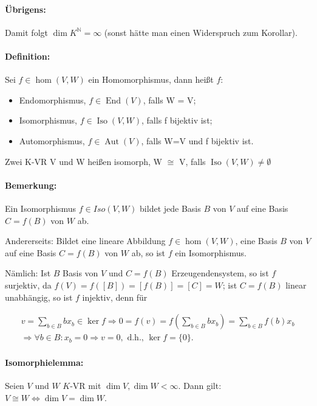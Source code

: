 \paragraph{Übrigens: }
	Damit folgt $\dim K^\mathbb{N} =\infty$ (sonst hätte man einen Widerspruch zum Korollar).
		
\paragraph{Definition: }
	Sei $f\in \hom(V,W)$ ein Homomorphismus, dann heißt $f$:
	\begin{itemize}
		\item Endomorphismus, $f\in \operatorname{End} (V)$, falls W = V;
		\item Isomorphismus, $f\in \operatorname{Iso}(V,W)$, falls f bijektiv ist;
		\item Automorphismus, $f\in \operatorname{Aut}(V)$, falls W=V und f bijektiv ist.
	\end{itemize}
	
	Zwei K-VR V und W heißen isomorph, W $\cong$ V, falls $\operatorname{Iso}(V,W) \neq \emptyset$

\paragraph{Bemerkung: }
	Ein Isomorphismus $f\in Iso(V,W)$ bildet jede Basis $B$ von $V$ auf eine Basis $C = f(B)$ von $W$ ab.
	
	Andererseits: Bildet eine lineare Abbildung $f\in \hom(V,W)$, eine Basis $B$ von $V$ auf eine Basis $C = f(B)$ von $W$ ab, so ist $f$ ein Isomorphismus.
	
	Nämlich: Ist $B$ Basis von $V$ und $ C = f(B)$ Erzeugendensystem, so ist $f$ surjektiv, da $f(V) = f ([B]) = [f(B)] = [C] = W$;
	ist $C =f(B)$ linear unabhängig, so ist $f$ injektiv, denn für
			
	\begin{gather*}
		v = \sum_{b\in B} bx_b \in \ker f \Rightarrow 0 = f(v) = f(\sum_{b\in B}bx_b) = \sum_{b\in B}f(b)x_b\\
		\Rightarrow \forall b \in B: x_b = 0 \Rightarrow v = 0, \text{ d.h., } \ker f=\{{0}\}.
	\end{gather*}
			
\paragraph{Isomorphielemma: }
	Seien $V$ und $W$ $ K $-VR mit $\dim V, \dim W < \infty$.
	Dann gilt: $V \cong W \Leftrightarrow \dim V = \dim W$.
	
